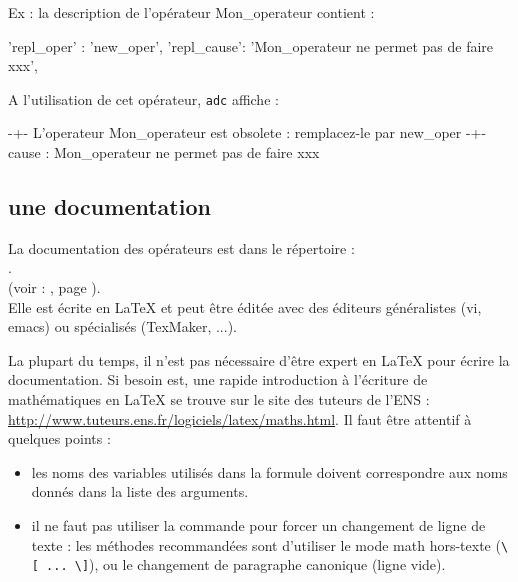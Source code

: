 \begin{itemize}
             Ex : la description de l'opérateur Mon\_operateur contient :

             \begin{boxedverbatim}
        'repl_oper' : 'new_oper',
        'repl_cause': 'Mon_operateur ne permet pas de faire xxx',
             \end{boxedverbatim}

             A l'utilisation de cet opérateur, \texttt{adc} affiche :

             \begin{boxedverbatim}
        -+- L'operateur Mon_operateur est obsolete : remplacez-le par new_oper
        -+- cause : Mon_operateur ne permet pas de faire xxx
             \end{boxedverbatim}
  \end{itemize}


\subsection{une documentation}

  La documentation des opérateurs est dans le répertoire : \\
  \-\hspace{1cm} . \\

  (voir : , page \pageref{sec:ex_doc_oper}). \\

  Elle est écrite en \LaTeX{} et peut être éditée avec des éditeurs
généralistes (vi, emacs) ou spécialisés (TexMaker, ...).

  La plupart du temps, il n'est pas nécessaire d'être expert en
\LaTeX{} pour écrire la documentation. Si besoin est, une
rapide introduction à l'écriture de mathématiques en
\LaTeX{}  se trouve sur le site des tuteurs de l'ENS :
\url{http://www.tuteurs.ens.fr/logiciels/latex/maths.html}.
Il faut être attentif à quelques points :

\begin{itemize}
  \item les noms des variables utilisés dans la formule doivent correspondre
    aux noms donnés dans la liste des arguments.
  \item il ne faut pas utiliser la commande
    \clavier{\textbackslash\textbackslash} pour forcer un changement de ligne
    de texte : les méthodes recommandées sont d'utiliser le mode math
    hors-texte (\verb+\[ ... \]+), ou le changement de paragraphe canonique
    (ligne vide).
\end{itemize}

